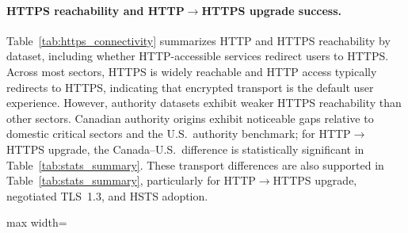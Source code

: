 \documentclass[a4paper,fleqn]{cas-sc}
\begin{document}
  \paragraph{HTTPS reachability and HTTP$\rightarrow$HTTPS upgrade success.}
  Table~\ref{tab:https_connectivity} summarizes HTTP and HTTPS reachability by dataset, including whether HTTP-accessible services redirect users to HTTPS.
  Across most sectors, HTTPS is widely reachable and HTTP access typically redirects to HTTPS, indicating that encrypted transport is the default user experience.
  However, authority datasets exhibit weaker HTTPS reachability than other sectors.
  Canadian authority origins exhibit noticeable gaps relative to domestic critical sectors and the U.S.\ authority benchmark; for HTTP$\rightarrow$HTTPS upgrade, the Canada--U.S.\ difference is statistically significant in Table~\ref{tab:stats_summary}.
  These transport differences are also supported in Table~\ref{tab:stats_summary}, particularly for HTTP$\rightarrow$HTTPS upgrade, negotiated TLS~1.3, and HSTS adoption.  

  \begin{table}[t]
  \caption{HTTP/HTTPS connectivity outcomes by dataset (percent of origins).}
  \label{tab:https_connectivity}
  \centering
  \scriptsize
  \setlength{\tabcolsep}{3pt}
  \renewcommand{\arraystretch}{1.15}
  
  \begin{adjustbox}{max width=\columnwidth}
  \end{adjustbox}
  \end{table}
\end{document}
